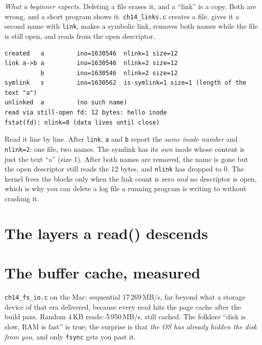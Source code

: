\begin{example}
\emph{What a beginner expects.} Deleting a file erases it, and a
``link'' is a copy. Both are wrong, and a short program shows it.
\texttt{ch14\_links.c} creates a file, gives it a second name with
\texttt{link}, makes a symbolic link, removes both names while the
file is still open, and reads from the open descriptor.

\begin{lstlisting}[basicstyle=\ttfamily\scriptsize,caption={Real output of
\texttt{ch14\_links} (Linux container; inode numbers differ on every
run).}]
created   a         ino=1630546  nlink=1 size=12
link a->b a         ino=1630546  nlink=2 size=12
          b         ino=1630546  nlink=2 size=12
symlink   s         ino=1630562  is-symlink=1 size=1 (length of the text "a")
unlinked  a         (no such name)
read via still-open fd: 12 bytes: hello inode
fstat(fd): nlink=0 (data lives until close)
\end{lstlisting}
Read it line by line. After \texttt{link}, \texttt{a} and \texttt{b}
report the \emph{same inode number} and \texttt{nlink=2}: one file,
two names. The symlink has its \emph{own} inode whose content is just
the text ``a'' (size 1). After both names are removed, the name is
gone but the open descriptor still reads the 12 bytes, and
\texttt{nlink} has dropped to 0. The kernel frees the blocks only when
the link count is zero \emph{and} no descriptor is open, which is why
you can delete a log file a running program is writing to without
crashing it.
\end{example}

\section{The layers a read() descends}
\label{sec:layers14}



\section{The buffer cache, measured}
\label{sec:cache14}



\begin{example}
\texttt{ch14\_fs\_io.c} on the Mac: sequential 17\,269\,MB/s,
far beyond what a storage device of that era delivered, because every
read hits the page cache after the build pass. Random 4\,KB reads:
5\,950\,MB/s, still cached. The folklore ``disk is slow, RAM is
fast'' is true; the surprise is that \emph{the OS has already hidden
the disk from you}, and only \texttt{fsync} gets you past it.
\end{example}


